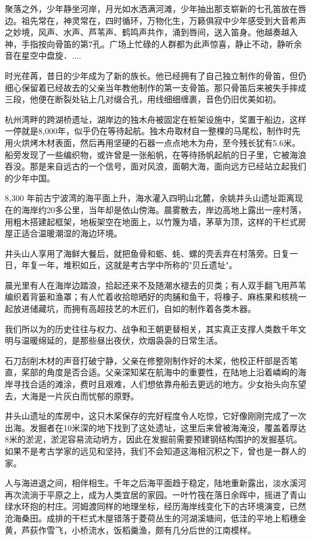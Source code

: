 聚落之外，少年静坐河岸，月光如水洒满河滩，少年抽出那支崭新的七孔笛放在唇边。祖先常在，神灵常在，四时循环，万物化生，万籁俱寂中少年感受到大音希声之妙境，风声、水声、芦苇声、鹤鸣声共作，涌到唇间，送入笛身。他越奏越入神，手指按向骨笛的第7孔。广场上忙碌的人群都为此声惊喜，静止不动，静听余音在星空中盘旋．....

时光荏苒，昔日的少年成为了新的族长。他已经拥有了自己独立制作的骨笛，但仍细心保留着已经故去的父亲当年教他制作的第一支骨笛。那只骨笛后来被失手摔成三段，他便在断裂处钻上几对缀合孔，用线细细缠裹，音色仍旧优美如初。

杭州湾畔的跨湖桥遗址，湖岸边的独木舟被固定在桩架设施中，奖置于船边，这样一停就是8,000年，似乎仍在等待起航。独木舟取材自一整棵的马尾松，制作时先用火烘烤木材表面，然后再用坚硬的石器一点点地木为舟，至今残长犹有5.6米。船旁发现了一些编织物，或许曾是一张船帆，在等待扬帆起航的日子里，它被海浪吞没。那是来自远古的一个信号，面对风浪，面朝大海，面向远方已经站立起我们的少年中国。

8,300 年前古宁波湾的海平面上升，海水灌入四明山北麓，余姚井头山遗址距离现在的海岸约20多公里，当年却是依山傍海。晨雾散去，岸边高地上露出一座村落，用粗木搭建起框架，地板架空在地面上，以竹篾为墙，茅草为顶，这样的干栏式房屋正适合温暖潮湿的海边环境。

井头山人享用了海鲜大餐后，就把鱼骨和蛎、蚝、螺的壳丢弃在村落旁。日复一日，年复一年，堆积如丘，这就是考古学中所称的"贝丘遗址"。

晨光里有人在海岸边踏浪，拾起还来不及随潮水褪去的贝类；有人双手翻飞用芦苇编织着背篓和渔罩；有人忙着收拾晾晒好的肉脯和鱼干，将橡子、麻栋果和核桃一起放进储藏坑，而拥有高超技艺的木匠们，自如的制作着各类木器。

我们所以为的历史往往与权力、战争和王朝更替相关，其实真正支撑人类数千年文明与温暖绵延的，是那些昼出夜伏，炊烟袅袅的日常生活。

石刀刮削木材的声音打破宁静，父亲在修整刚制作好的木桨，他校正杆部是否笔直，桨部的角度是否合适。父亲深知桨在航海中的重要性，在陆地上沿着嶙峋的海岸寻找合适的滩涂，费时且艰难，人们想依靠舟船去更远的地方。少女抬头向东望去，大海是一片灰白而忧郁的原野。

井头山遗址的库房中，这只木桨保存的完好程度令人吃惊，它好像刚刚完成了一次出海。发掘者在10米深的地下找到了这处遗址，这里后来曾被海淹没，覆盖着厚达8米的淤泥，淤泥容易流动坍方，因此在发掘前需要预建钢结构围护的发掘基坑。如果不是考古学家的远见和坚持，我们不会知道这海相沉积之下，曾也是一群人的家。

人与海进退之间，相伴相生。千年之后海平面趋于稳定，陆地重新露出，淡水溪河再次流淌于平原之上，成为人类宜居的家园。一叶竹筏在落日余晖中，摇进了青山绿水环抱的村庄。河姆渡同样的地理坐标，经历海岸线变化下的古环境演变，已然沧海桑田。成排的干栏式木屋错落于菱荷丛生的河湖溪塘间，低洼的平地上稻穗金黄，芦荻作雪飞，小桥流水，饭稻羹渔，颇有几分后世的江南模样。

